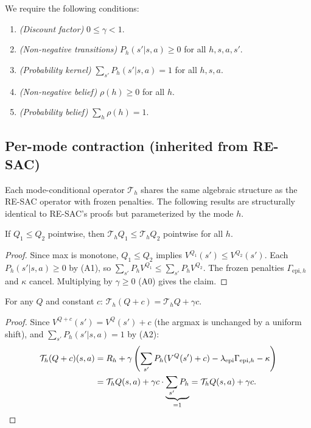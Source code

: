 We require the following conditions:
\begin{enumerate}
    \item[\textbf{(A0)}] \textit{(Discount factor)} $0 \leq \gamma < 1$.
    \item[\textbf{(A1)}] \textit{(Non-negative transitions)} $P_h(s'|s,a) \geq 0$ for all $h,s,a,s'$.
    \item[\textbf{(A2)}] \textit{(Probability kernel)} $\sum_{s'} P_h(s'|s,a) = 1$ for all $h,s,a$.
    \item[\textbf{(A3)}] \textit{(Non-negative belief)} $\rho(h) \geq 0$ for all $h$.
    \item[\textbf{(A4)}] \textit{(Probability belief)} $\sum_{h} \rho(h) = 1$.
\end{enumerate}

\subsection{Per-mode contraction (inherited from RE-SAC)}

Each mode-conditional operator $\mathcal{T}_h$ shares the same algebraic structure as the RE-SAC operator with frozen penalties. The following results are structurally identical to RE-SAC's proofs but parameterized by the mode $h$.

\begin{lemma}
    \label{lem:mode_mono}
    If $Q_1 \leq Q_2$ pointwise, then $\mathcal{T}_h Q_1 \leq \mathcal{T}_h Q_2$ pointwise for all $h$.
\end{lemma}
\begin{proof}
Since max is monotone, $Q_1 \leq Q_2$ implies $V^{Q_1}(s') \leq V^{Q_2}(s')$. Each $P_h(s'|s,a) \geq 0$ by (A1), so $\sum_{s'} P_h V^{Q_1} \leq \sum_{s'} P_h V^{Q_2}$. The frozen penalties $\Gamma_{\text{epi},h}$ and $\kappa$ cancel. Multiplying by $\gamma \geq 0$ (A0) gives the claim.
\end{proof}

\begin{lemma}
    \label{lem:mode_disc}
    For any $Q$ and constant $c$: $\mathcal{T}_h(Q + c) = \mathcal{T}_h Q + \gamma c$.
\end{lemma}
\begin{proof}
Since $V^{Q+c}(s') = V^Q(s') + c$ (the argmax is unchanged by a uniform shift), and $\sum_{s'} P_h(s'|s,a) = 1$ by (A2):
\begin{align}
    \mathcal{T}_h(Q+c)(s,a) &= R_h + \gamma\left(\sum_{s'} P_h(V^Q(s') + c) - \lambda_{\text{epi}}\Gamma_{\text{epi},h} - \kappa\right) \notag \\
    &= \mathcal{T}_h Q(s,a) + \gamma c \cdot \underbrace{\sum_{s'} P_h}_{=1} = \mathcal{T}_h Q(s,a) + \gamma c. \qedhere
\end{align}
\end{proof}

